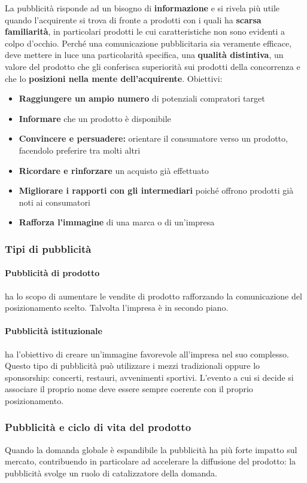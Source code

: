 La pubblicità risponde ad un bisogno di \textbf{informazione} e si
rivela più utile quando l’acquirente si trova di fronte a prodotti con i quali ha \textbf{scarsa familiarità}, in particolari prodotti le cui caratteristiche non sono evidenti a colpo d’occhio.
Perché una comunicazione pubblicitaria sia veramente
efficace, deve mettere in luce una particolarità specifica, una \textbf{qualità distintiva}, un valore del prodotto che gli conferisca superiorità sui prodotti della concorrenza e che lo \textbf{posizioni nella mente dell'acquirente}. \newline
Obiettivi:
\begin{itemize}
	\item \textbf{Raggiungere un ampio numero} di potenziali compratori target
	\item \textbf{Informare} che un prodotto è disponibile
	\item \textbf{Convincere e persuadere:} orientare il consumatore verso un prodotto, facendolo preferire tra molti altri
	\item \textbf{Ricordare e rinforzare} un acquisto già effettuato
	\item \textbf{Migliorare i rapporti con gli intermediari} poiché offrono prodotti già noti ai consumatori
	\item \textbf{Rafforza l’immagine} di una marca o di un’impresa
\end{itemize}

\subsubsection{Tipi di pubblicità}
\paragraph{Pubblicità di prodotto} ha lo scopo di aumentare le vendite di prodotto rafforzando la
comunicazione del posizionamento scelto. Talvolta l’impresa è in secondo piano.
\paragraph{Pubblicità istituzionale}
ha l’obiettivo di creare un’immagine favorevole all'impresa nel suo complesso. Questo tipo di pubblicità può utilizzare i mezzi tradizionali oppure lo sponsorship: concerti, restauri, avvenimenti
sportivi. L’evento a cui si decide si associare il proprio nome deve essere sempre coerente con il proprio posizionamento.

\subsubsection{Pubblicità e ciclo di vita del prodotto}
Quando la domanda globale è espandibile la pubblicità ha più forte impatto sul mercato, contribuendo in particolare ad accelerare la diffusione del prodotto: la pubblicità svolge un ruolo di catalizzatore della domanda.

